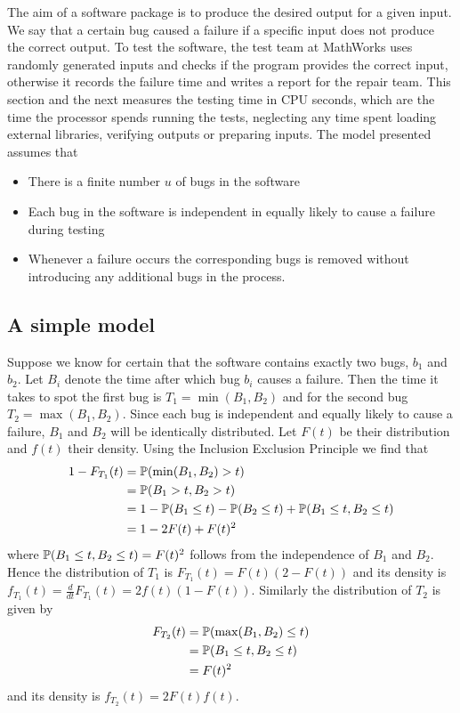 The aim of a software package is to produce the desired output for a given input. We say that a certain bug caused a failure if a specific input does not produce the correct output. To test the software, the test team at MathWorks uses randomly generated inputs and checks if the program provides the correct input, otherwise it records the failure time and writes a report for the repair team. This section and the next measures the testing time in CPU seconds, which are the time the processor spends running the tests, neglecting any time spent loading external libraries, verifying outputs or preparing inputs. The model presented assumes that
\begin{itemize}
    \item There is a finite number $u$ of bugs in the software
    \item Each bug in the software is independent in equally likely to cause a failure during testing
    \item Whenever a failure occurs the corresponding bugs is removed without introducing any additional bugs in the process.
\end{itemize}
\subsection{A simple model}\label{sec:simple-model}
Suppose we know for certain that the software contains exactly two bugs, $b_1$ and $b_2$. Let $B_i$ denote the time after which bug $b_i$ causes a failure. Then the time it takes to spot the first bug is $T_1=\min (B_1, B_2)$ and for the second bug $T_2=\max (B_1, B_2)$. Since each bug is independent and equally likely to cause a failure, $B_1$ and $B_2$ will be identically distributed. Let $F(t)$ be their distribution and $f(t)$ their density. Using the Inclusion Exclusion Principle we find that
\begin{align*}
    1-F_{T_1}(t)&=\mathbb{P}(\min (B_1, B_2)>t)\\
    &=\mathbb{P}(B_1>t, B_2>t)\\
    &= 1- \mathbb{P}(B_1\leq t) - \mathbb{P}(B_2\leq t) + \mathbb{P}(B_1\leq t, B_2\leq t)\\
    &= 1 - 2F(t) + F(t)^2
\end{align*}
where $\mathbb{P}(B_1\leq t, B_2\leq t)=F(t)^2$ follows from the independence of $B_1$ and $B_2$. Hence the distribution of $T_1$ is $F_{T_1}(t)=F(t)(2-F(t))$ and its density is $f_{T_1}(t)=\frac{d}{dt}F_{T_1}(t)=2f(t)(1-F(t))$. Similarly the distribution of $T_2$ is given by
\begin{align*}
    F_{T_2}(t)&=\mathbb{P}(\max(B_1, B_2)\leq t)\\
    &=\mathbb{P}(B_1\leq t, B_2\leq t)\\
    &=F(t)^2
\end{align*}
and its density is $f_{T_2}(t)=2F(t)f(t)$.

